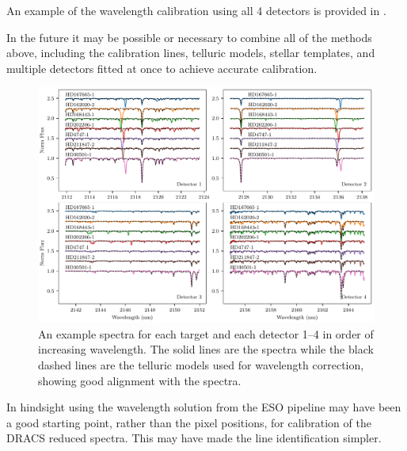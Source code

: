 An example of the wavelength calibration using all 4 detectors is provided in .

In the future it may be possible or necessary to combine all of the methods above, including the \thar{} calibration lines, telluric models, stellar templates, and multiple detectors fitted at once to achieve accurate calibration.

\begin{figure}
    \centering
    \includegraphics[width=1\linewidth]{figures/reduction/Spectra_examples}
    \caption{An example spectra for each target and each detector 1--4 in order of increasing wavelength. The solid lines are the spectra while the black dashed lines are the telluric models used for wavelength correction, showing good alignment with the spectra.}
    \label{fig:spectraexamples}
\end{figure}







In hindsight using the wavelength solution from the {ESO} pipeline may have been a good starting point, rather than the pixel positions, for calibration of the {DRACS} reduced spectra. This may have made the line identification simpler.


